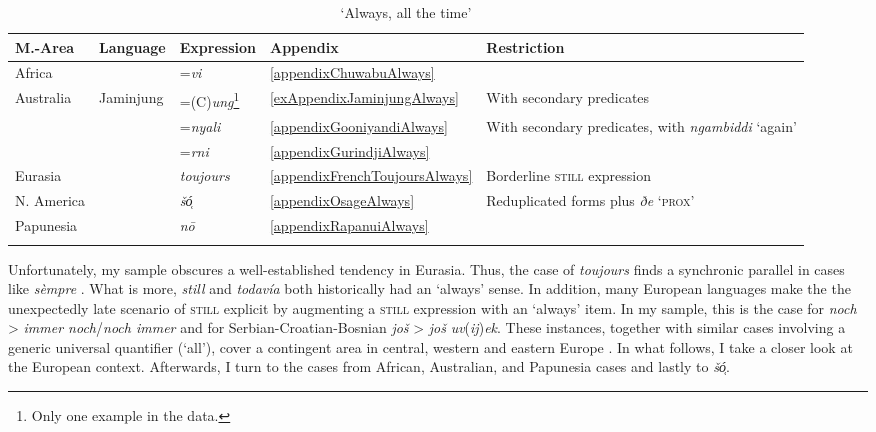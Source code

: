 \begin{table}
	\small
	\caption{\lq Always, all the time'}
	\label{tableAlways}
		\begin{tabularx}{\textwidth}{llllQ}
		\lsptoprule
		M.-Area & Language & Expression & Appendix & Restriction\\\midrule
		Africa &  & =\textit{vi} & \ref{appendixChuwabuAlways} \\
		Australia & Jaminjung & =(C)\textit{ung}\footnote{Only one example in the data.} & \ref{exAppendixJaminjungAlways} & With secondary predicates \\
		&  & =\textit{nyali}	& \ref{appendixGooniyandiAlways} &	 With secondary predicates, with \textit{ngambiddi} \lq again'\\
		&  & =\textit{rni} & \ref{appendixGurindjiAlways}\\
		Eurasia & 	 & \textit{toujours} & \ref{appendixFrenchToujoursAlways} & Borderline \textsc{still} expression\\
		N. America &  & \textit{šó̜} & \ref{appendixOsageAlways} & Reduplicated forms plus \textit{ðe} \lq \textsc{prox}\rq{}\\
		Papunesia &  & \textit{nō} &\ref{appendixRapanuiAlways}\\
		\lspbottomrule
		\end{tabularx}
\end{table}

Unfortunately, my sample obscures a well-established tendency in Eurasia. Thus, the case of  \textit{toujours} finds a synchronic parallel in cases like  \textit{sèmpre} \parencite[619]{GDLI}. What is more,  \textit{still} and  \textit{todavía} both historically had an \lq always\rq{ }sense. In addition, many European languages make the the unexpectedly late scenario of \textsc{still} explicit by augmenting a \textsc{still} expression with an \lq always\rq{ }item. In my sample, this is the case for  \textit{noch} > \textit{immer noch}/\textit{noch immer} and for Serbian\hyp Croatian\hyp Bosnian \textit{još} > \textit{još} \mbox{\textit{uv}(\textit{ij})\textit{ek}}. These instances, together with similar cases involving a generic universal quantifier (\lq all\rq{}), cover a contingent area in central, western and eastern Europe \parencite[85–90]{vanderAuwera1998}. In what follows, I take a closer look at the European context. Afterwards, I turn to the cases from African, Australian, and Papunesia cases and lastly to  \textit{šó̜}. 

